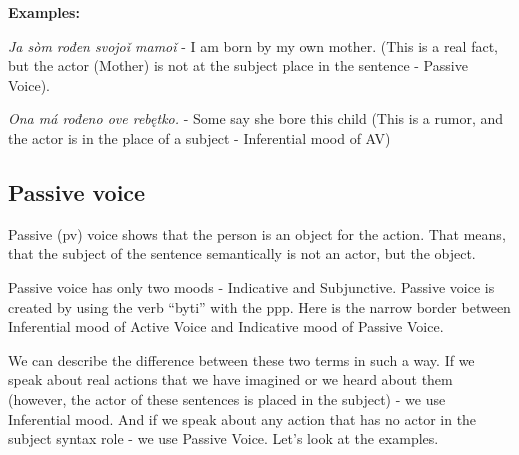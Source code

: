 \textbf{Examples:}

\textit{Ja sòm rođen svojoǐ mamoǐ} - I am born by my own mother. (This is a real fact, but the actor (Mother) is not at the subject place in the sentence - Passive Voice).

\textit{Ona má rođeno ove rebętko.} - Some say she bore this child (This is a rumor, and the actor is in the place of a subject - Inferential mood of AV)

\subsection{Passive voice}


Passive (\gls{pv}) voice shows that the person is an object for the action. That means, that the subject of the sentence semantically is not an actor, but the object. 

Passive voice has only two moods - Indicative and Subjunctive. Passive voice is created by using the verb “byti” with the \gls{ppp}. Here is the narrow border between Inferential mood of Active Voice and Indicative mood of Passive Voice.

We can describe the difference between these two terms in such a way. If we speak about real actions that we have imagined or we heard about them (however, the actor of these sentences is placed in the subject) - we use Inferential mood. And if we speak about any action that has no actor in the subject syntax role - we use Passive Voice. Let’s look at the examples.







